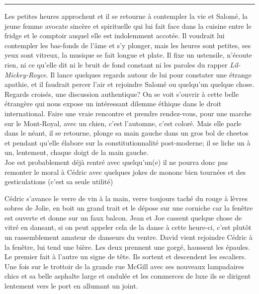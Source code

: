 \begin{center}\noindent\rule{0.5\textwidth}{0.4pt}\end{center} Les petites
heures approchent et il se retourne à contempler la vie et Salomé, la jeune
femme avocate sincère et spirituelle qui lui fait face dans la cuisine entre le
fridge et le comptoir auquel elle est indolemment accotée. Il voudrait lui
contempler les bas-fonds de l'âme et s'y plonger, mais les heures sont petites,
ses yeux sont vitreux, la musique se fait longue et plate.  Il fixe un
ustensile, n'écoute rien, ni ce qu'elle dit ni le bruit
de fond constant ni les paroles du rapper \textit{Lil-Mickey-Royce}. Il lance
quelques regards autour de lui pour constater une étrange apathie, et il
faudrait percer l'air et rejoindre Salomé ou quelqu'un quelque chose.
Regards croisés, une discussion authentique? On se voit s'ouvrir à cette
belle étrangère qui nous expose un intéressant dilemme éthique dans le droit
international. Faire une vraie rencontre et prendre rendez-vous, pour une
marche sur le Mont-Royal, avec un chien, c'est l'automne, c'est coloré. Mais
elle parle dans le néant, il se retourne,
plonge sa main gauche dans un gros bol de
cheetos et pendant qu'elle élabore sur la constitutionnalité post-moderne;
il se liche un à un, lentement, chaque doigt de la main gauche. \\


Joe est probablement déjà rentré avec quelqu'un(e) il ne pourra donc pas
remonter le moral à Cédric avec quelques jokes de mononc bien tournées et des
gesticulations (c'est sa seule utilité)

Cédric s'avance le verre de vin à la main, verre toujours
taché du rouge à lèvres sobres de Jolie, en boit un grand trait et le dépose sur
une corniche car la fenêtre est ouverte et donne sur un faux balcon. Jean et Joe
cassent quelque chose de vitré en dansant, si on peut appeler cela de
la danse à cette heure-ci, c'est plutôt un rassemblement amateur de danseurs
du ventre. David vient rejoindre Cédric à la fenêtre, lui tend une bière.
Les deux prennent une gorgé, haussent les épaules. Le premier fait à l'autre un
signe de tête. Ils sortent et descendent les escaliers.\\

Une fois
sur le trottoir de la grande
rue McGill avec ses nouveaux lampadaires chics et sa belle asphalte large et
ondulée et les commerces de luxe ils se dirigent lentement vers le port en
allumant un joint. 

